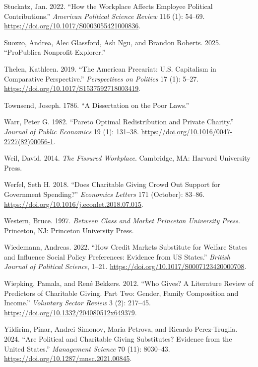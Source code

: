 \documentclass[
  11pt,
  oneside]{article}
\newlength{\cslhangindent}
\newenvironment{CSLReferences}[2] %
 {\begin{list}{}{%
  \setlength{\itemindent}{0pt}
  \setlength{\leftmargin}{0pt}
  \setlength{\parsep}{0pt}
  \ifodd #1
   \setlength{\leftmargin}{\cslhangindent}
   \setlength{\itemindent}{-1\cslhangindent}
  \fi
  \setlength{\itemsep}{#2\baselineskip}}}
 {\end{list}}
\begin{document}
\begin{CSLReferences}{1}{0}
Stuckatz, Jan. 2022. {``How the {Workplace Affects Employee Political Contributions}.''} \emph{American Political Science Review} 116 (1): 54--69. \url{https://doi.org/10.1017/S0003055421000836}.

Suozzo, Andrea, Alec Glassford, Ash Ngu, and Brandon Roberts. 2025. {``{ProPublica Nonprofit Explorer}.''}

Thelen, Kathleen. 2019. {``The {American Precariat}: {U}.{S}. {Capitalism} in {Comparative Perspective}.''} \emph{Perspectives on Politics} 17 (1): 5--27. \url{https://doi.org/10.1017/S1537592718003419}.

Townsend, Joseph. 1786. {``A {Dissertation} on the {Poor Laws}.''}

Warr, Peter G. 1982. {``Pareto Optimal Redistribution and Private Charity.''} \emph{Journal of Public Economics} 19 (1): 131--38. \url{https://doi.org/10.1016/0047-2727(82)90056-1}.

Weil, David. 2014. \emph{The {Fissured Workplace}}. Cambridge, MA: Harvard University Press.

Werfel, Seth H. 2018. {``Does Charitable Giving Crowd Out Support for Government Spending?''} \emph{Economics Letters} 171 (October): 83--86. \url{https://doi.org/10.1016/j.econlet.2018.07.015}.

Western, Bruce. 1997. \emph{Between {Class} and {Market} {\textbar} {Princeton University Press}}. Princeton, NJ: Princeton University Press.

Wiedemann, Andreas. 2022. {``How {Credit Markets Substitute} for {Welfare States} and {Influence Social Policy Preferences}: {Evidence} from {US States}.''} \emph{British Journal of Political Science}, 1--21. \url{https://doi.org/10.1017/S0007123420000708}.

Wiepking, Pamala, and René Bekkers. 2012. {``Who Gives? {A} Literature Review of Predictors of Charitable Giving. {Part Two}: {Gender}, Family Composition and Income.''} \emph{Voluntary Sector Review} 3 (2): 217--45. \url{https://doi.org/10.1332/204080512x649379}.

Yildirim, Pinar, Andrei Simonov, Maria Petrova, and Ricardo Perez-Truglia. 2024. {``Are {Political} and {Charitable Giving Substitutes}? {Evidence} from the {United States}.''} \emph{Management Science} 70 (11): 8030--43. \url{https://doi.org/10.1287/mnsc.2021.00845}.

\end{CSLReferences}
\end{document}
